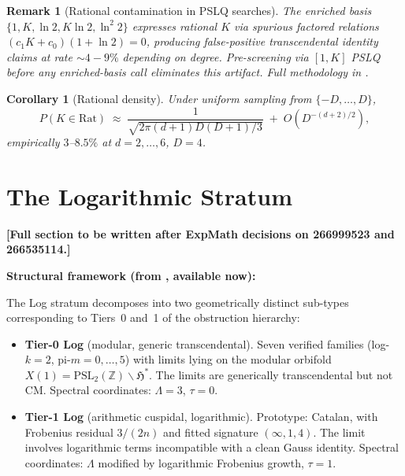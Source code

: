 \documentclass[12pt]{amsart}
\newcommand{\PLACEHOLDER}[1]{{\color{red}\textbf{[#1]}}}
\newtheorem{corollary}[theorem]{Corollary}
\newtheorem{remark}[theorem]{Remark}
\begin{document}
\begin{remark}[Rational contamination in
  PSLQ searches]
The enriched basis $\{1,K,\ln 2,K\ln 2,\ln^2 2\}$
expresses rational $K$ via spurious factored
relations $(c_1 K+c_0)(1+\ln 2)=0$, producing
false-positive transcendental identity claims
at rate $\sim\!4{-}9\%$ depending on degree.
Pre-screening via $[1,K]$ PSLQ before any
enriched-basis call eliminates this artifact.
Full methodology in \cite{Rat}.
\end{remark}

\begin{corollary}[Rational density]
Under uniform sampling from $\{-D,\ldots,D\}$,
\[
  P(K \in \mathrm{Rat}) \;\approx\;
  \frac{1}{\sqrt{2\pi(d+1)D(D+1)/3}}
  \;+\; O(D^{-(d+2)/2}),
\]
empirically $3$--$8.5\%$ at $d=2,\ldots,6$,
$D=4$.
\end{corollary}

\section{The Logarithmic Stratum}
\label{sec:log}

\PLACEHOLDER{Full section to be written after
ExpMath decisions on 266999523 and 266535114.}

\medskip\noindent\textbf{Structural framework
(from \cite{Obstruction}, available now):}

The Log stratum decomposes into two
geometrically distinct sub-types corresponding
to Tiers~0 and~1 of the obstruction hierarchy:

\begin{itemize}
\item \textbf{Tier-0 Log} (modular,
  generic transcendental).
  Seven verified families
  (\textnormal{log-}$k=2$,
  \textnormal{pi-}$m=0,\ldots,5$)
  with limits lying on the modular orbifold
  $X(1) = \mathrm{PSL}_2(\mathbb{Z})\backslash
  \mathfrak{H}^*$.
  The limits are generically transcendental
  but not CM.
  Spectral coordinates: $\Lambda=3$,
  $\tau=0$.

\item \textbf{Tier-1 Log} (arithmetic cuspidal,
  logarithmic).
  Prototype: Catalan, with Frobenius residual
  $3/(2n)$ and fitted signature $(\infty,1,4)$.
  The limit involves logarithmic terms
  incompatible with a clean Gauss identity.
  Spectral coordinates: $\Lambda$ modified by
  logarithmic Frobenius growth, $\tau=1$.
\end{itemize}
\end{document}
